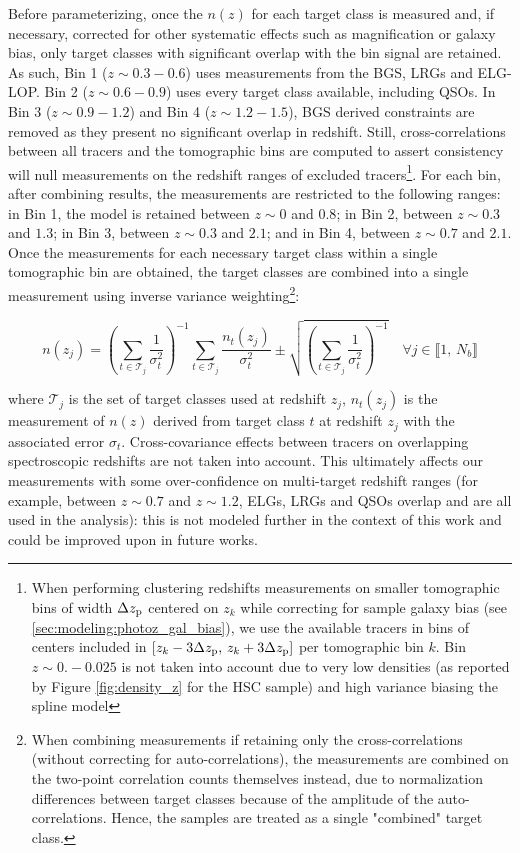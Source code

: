 Before parameterizing, once the $n(z)$ for each target class is measured and, if necessary, corrected for other systematic effects such as magnification or galaxy bias, only target classes with significant overlap with the bin signal are retained. As such, Bin 1 ($z\sim0.3-0.6$) uses measurements from the BGS, LRGs and ELG-LOP. Bin 2 ($z\sim0.6-0.9$) uses every target class available, including QSOs. In Bin 3 ($z\sim0.9-1.2$) and Bin 4 ($z\sim1.2-1.5$), BGS derived constraints are removed as they present no significant overlap in redshift. Still, cross-correlations between all tracers and the tomographic bins are computed to assert consistency will null measurements on the redshift ranges of excluded tracers\footnote{When performing clustering redshifts measurements on smaller tomographic bins of width $\Delta z_{\mathrm{p}}$ centered on $z_k$ while correcting for sample galaxy bias (see \ref{sec:modeling:photoz_gal_bias}), we use the available tracers in bins of centers included in $\left[z_k-3\Delta z_{\mathrm{p}},\,z_k+3\Delta z_{\mathrm{p}}\right]$ per tomographic bin $k$. Bin $z\sim0.-0.025$ is not taken into account due to very low densities (as reported by Figure \ref{fig:density_z} for the HSC sample) and high variance biasing the spline model}. For each bin, after combining results, the measurements are restricted to the following ranges: in Bin 1, the model is retained between $z\sim0$ and $0.8$; in Bin 2, between $z\sim0.3$ and $1.3$; in Bin 3, between $z\sim0.3$ and $2.1$; and in Bin 4, between $z\sim0.7$ and $2.1$. Once the measurements for each necessary target class within a single tomographic bin are obtained, the target classes are combined into a single measurement using inverse variance weighting\footnote{When combining measurements if retaining only the cross-correlations (without correcting for auto-correlations), the measurements are combined on the two-point correlation counts themselves instead, due to normalization differences between target classes because of the amplitude of the auto-correlations. Hence, the samples are treated as a single "combined" target class.}:

\begin{equation}
   n(z_j)=\left(\sum\limits_{t\in\mathcal{T}_j}\frac{1}{\sigma_t^2}\right)^{-1}\sum\limits_{t\in\mathcal{T}_j}\frac{n_t(z_j)}{\sigma_t^2}\pm\sqrt{\left(\sum\limits_{t\in\mathcal{T}_j}\frac{1}{\sigma_t^2}\right)^{-1}}\quad\forall j\in\llbracket 1,\,N_{b}\rrbracket
\end{equation}

where $\mathcal{T}_j$ is the set of target classes used at redshift $z_j$, $n_t(z_j)$ is the measurement of $n(z)$ derived from target class $t$ at redshift $z_j$  with the associated error $\sigma_t$. Cross-covariance effects between tracers on overlapping spectroscopic redshifts are not taken into account. This ultimately affects our measurements with some over-confidence on multi-target redshift ranges (for example, between $z\sim0.7$ and $z\sim1.2$, ELGs, LRGs and QSOs overlap and are all used in the analysis): this is not modeled further in the context of this work and could be improved upon in future works. %

